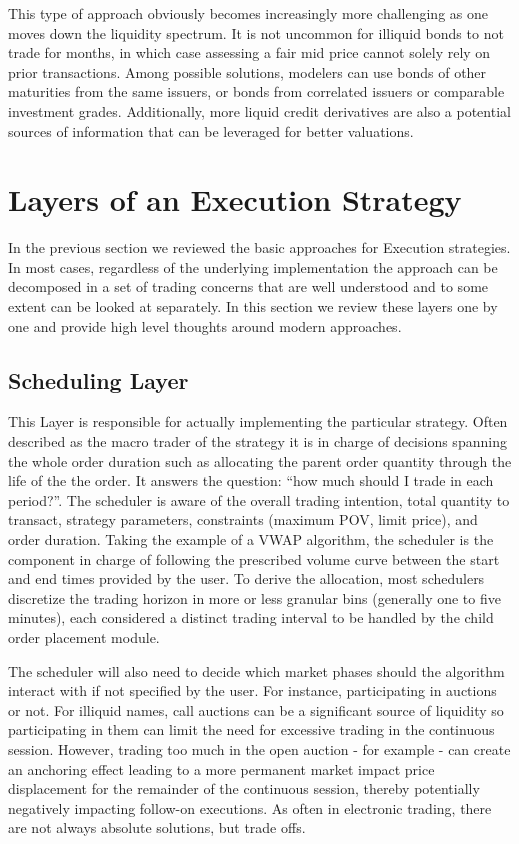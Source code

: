 \begin{enumerate}
This type of approach obviously becomes increasingly more challenging as one moves down the liquidity spectrum. It is not uncommon for illiquid bonds to not trade for months, in which case assessing a fair mid price cannot solely rely on prior transactions. Among possible solutions, modelers can use bonds of other maturities from the same issuers, or bonds from correlated issuers or comparable investment grades. Additionally, more liquid credit derivatives are also a potential sources of information that can be leveraged for better valuations.
\end{enumerate}



\section{Layers of an Execution Strategy}

In the previous section we reviewed the basic approaches for Execution strategies. In most cases, regardless of the underlying implementation the approach can be decomposed in a set of trading concerns that are well understood and to some extent can be looked at separately. In this section we review these layers one by one and provide high level thoughts around modern approaches.

\subsection{Scheduling Layer}

This Layer is responsible for actually implementing the particular strategy. Often described as the macro trader of the strategy it is in charge of decisions spanning the whole order duration such as allocating the parent order quantity through the life of the the order. It answers the question: “how much should I trade in each period?”. The scheduler is aware of the overall trading intention, total quantity to transact, strategy parameters, constraints (maximum POV, limit price), and order duration. Taking the example of a VWAP algorithm, the scheduler is the component in charge of following the prescribed volume curve between the start and end times provided by the user. To derive the allocation, most schedulers discretize the trading horizon in more or less granular bins (generally one to five minutes), each considered a distinct trading interval to be handled by the child order placement module.

The scheduler will also need to decide which market phases should the algorithm interact with if not specified by the user. For instance, participating in auctions or not. For illiquid names, call auctions can be a significant source of liquidity so participating in them can limit the need for excessive trading in the continuous session. However, trading too much in the open auction - for example - can create an anchoring effect leading to a more permanent market impact price displacement for the remainder of the continuous session, thereby potentially negatively impacting follow-on executions. As often in electronic trading, there are not always absolute solutions, but trade offs.


